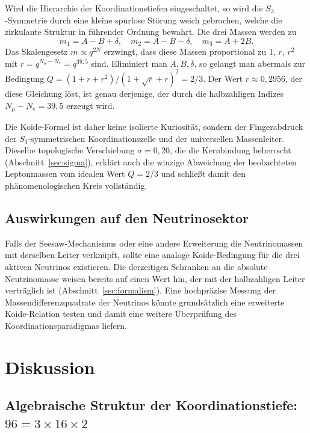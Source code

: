 \documentclass[11pt,a4paper]{article}
\begin{document}
Wird die Hierarchie der Koordinationstiefen eingeschaltet, so wird die
$S_3$‑Symmetrie durch eine kleine spurlose Störung weich gebrochen, welche
die zirkulante Struktur in führender Ordnung bewahrt.  Die drei Massen
werden zu
\begin{equation}
	m_1 = A - B + \delta,\quad
	m_2 = A - B - \delta,\quad
	m_3 = A + 2B.
\end{equation}
Das Skalengesetz $m \propto q^{2N}$ erzwingt, dass diese Massen
proportional zu $1$, $r$, $r^2$ mit $r = q^{N_\mu - N_e} = q^{39{,}5}$
sind.  Eliminiert man $A,B,\delta$, so gelangt man abermals zur Bedingung
$Q = (1+r+r^2)/(1+\sqrt{r}+r)^2 = 2/3$.  Der Wert $r \approx 0{,}2956$,
der diese Gleichung löst, ist genau derjenige, der durch die halbzahligen
Indizes $N_\mu - N_e = 39{,}5$ erzeugt wird.

Die Koide‑Formel ist daher keine isolierte Kuriosität, sondern der
Fingerabdruck der $S_3$‑symmetrischen Koordinationszelle und der
universellen Massenleiter.  Dieselbe topologische Verschiebung
$\sigma = 0{,}20$, die die Kernbindung beherrscht
(Abschnitt~\ref{sec:sigma}), erklärt auch die winzige Abweichung der
beobachteten Leptonmassen vom idealen Wert $Q = 2/3$ und schließt damit
den phänomenologischen Kreis vollständig.

\subsection{Auswirkungen auf den Neutrinosektor}

Falls der Seesaw‑Mechanismus oder eine andere Erweiterung die
Neutrinomassen mit derselben Leiter verknüpft, sollte eine analoge
Koide‑Bedingung für die drei aktiven Neutrinos existieren.  Die derzeitigen
Schranken an die absolute Neutrinomasse weisen bereits auf einen Wert hin,
der mit der halbzahligen Leiter verträglich ist
(Abschnitt~\ref{sec:formalism}).  Eine hochpräzise Messung der
Massendifferenzquadrate der Neutrinos könnte grundsätzlich eine
erweiterte Koide‑Relation testen und damit eine weitere Überprüfung des
Koordinationsparadigmas liefern.

	\section{Diskussion}
	\label{sec:discussion}
	
	\subsection{Algebraische Struktur der Koordinationstiefe: \(96 = 3 \times 16 \times 2\)}
	
\end{document}
